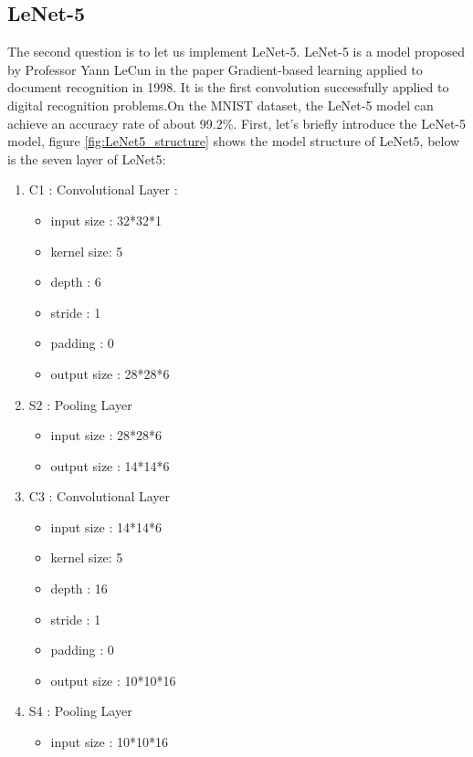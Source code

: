 \documentclass[conference]{IEEEtran}
\begin{document}
    \subsection{LeNet-5}
    The second question is to let us implement LeNet-5. LeNet-5 is a model proposed by Professor Yann LeCun in the paper Gradient-based learning applied to document recognition in 1998. It is the first convolution successfully applied to digital recognition problems.On the MNIST dataset, the LeNet-5 model can achieve an accuracy rate of about 99.2\%.
    \indent First, let's briefly introduce the LeNet-5 model, figure \ref{fig:LeNet5_structure} shows the model structure of LeNet5, below is the seven layer of LeNet5:
    \begin{enumerate}
        \item C1 : Convolutional Layer : 
        \begin{itemize}
            \item input size : 32*32*1
            \item kernel size: 5
            \item depth : 6
            \item stride : 1
            \item padding : 0
            \item output size : 28*28*6
        \end{itemize}
        \item S2 : Pooling Layer
        \begin{itemize}
            \item input size : 28*28*6
            \item output size : 14*14*6
        \end{itemize}
        \item C3 : Convolutional Layer
        \begin{itemize}
            \item input size : 14*14*6
            \item kernel size: 5
            \item depth : 16
            \item stride : 1
            \item padding : 0
            \item output size : 10*10*16
        \end{itemize}
        \item S4 : Pooling Layer
        \begin{itemize}
            \item input size : 10*10*16

\end{itemize}
\end{enumerate}
\end{document}
